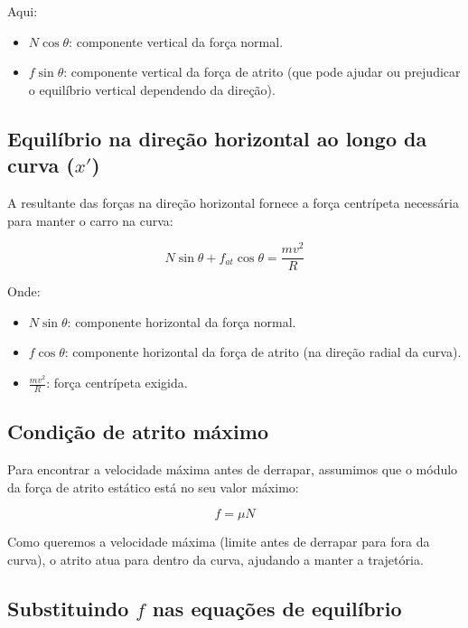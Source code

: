 \documentclass[a4paper,12pt]{article}
\begin{document}
\begin{flushleft}
Aqui:

\begin{itemize}
  \item \( N \cos\theta \): componente vertical da força normal.
  \item \( f \sin\theta \): componente vertical da força de atrito (que pode ajudar ou prejudicar o equilíbrio vertical dependendo da direção).
\end{itemize}

\subsection*{Equilíbrio na direção horizontal ao longo da curva (\( x' \))}

A resultante das forças na direção horizontal fornece a força centrípeta necessária para manter o carro na curva:

\begin{equation}
N \sin\theta + f_{at} \cos\theta = \frac{mv^2}{R}
\label{eq:equilibrio_x}
\end{equation}

Onde:

\begin{itemize}
  \item \( N \sin\theta \): componente horizontal da força normal.
  \item \( f \cos\theta \): componente horizontal da força de atrito (na direção radial da curva).
  \item \( \frac{mv^2}{R} \): força centrípeta exigida.
\end{itemize}

\subsection*{Condição de atrito máximo}

Para encontrar a velocidade máxima antes de derrapar, assumimos que o módulo da força de atrito estático está no seu valor máximo:

\begin{equation}
f = \mu N
\label{eq:atrito}
\end{equation}

Como queremos a velocidade máxima (limite antes de derrapar para fora da curva), o atrito atua para dentro da curva, ajudando a manter a trajetória.

\subsection*{Substituindo \( f \) nas equações de equilíbrio}


\end{flushleft}
\end{document}
